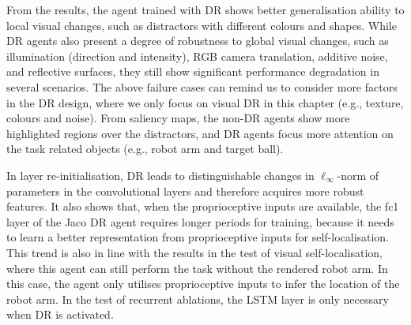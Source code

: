 From the results, the agent trained with DR shows better generalisation ability to local visual changes, such as distractors with different colours and shapes. While DR agents also present a degree of robustness to global visual changes, such as illumination (direction and intensity), RGB camera translation, additive noise, and reflective surfaces, they still show significant performance degradation in several scenarios. The above failure cases can remind us to consider more factors in the DR design, where we only focus on visual DR in this chapter (e.g., texture, colours and noise). From saliency maps, the non-DR agents show more highlighted regions over the distractors, and DR agents focus more attention on the task related objects (e.g., robot arm and target ball). 

 In layer re-initialisation, DR leads to distinguishable changes in $\ell_{\infty}$-norm of parameters in the convolutional layers and therefore acquires more robust features. It also shows that, when the proprioceptive inputs are available, the fc1 layer of the Jaco DR agent requires longer periods for training,  because it needs to learn a better representation from proprioceptive inputs for self-localisation. This trend is also in line with the results in the test of visual self-localisation, where this agent can still perform the task without the rendered robot arm. In this case, the agent only utilises proprioceptive inputs to infer the location of the robot arm. In the test of recurrent ablations, the LSTM layer is only necessary when DR is activated.

